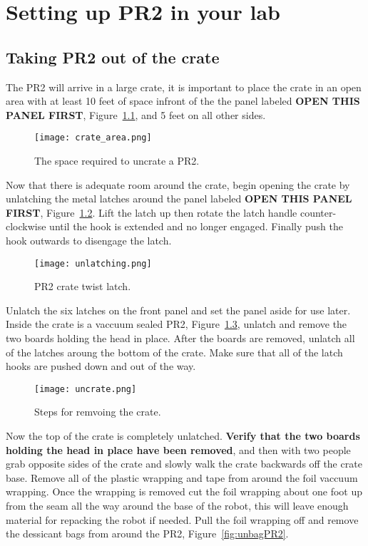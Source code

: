 \chapter{Setting up PR2 in your lab}
\section{Taking PR2 out of the crate}
The PR2 will arrive in a large crate, it is important to place the crate in an
open area with at least 10 feet of space infront of the the panel labeled {\bf
  OPEN THIS PANEL FIRST}, Figure~\ref{fig:crate_space}, and 5 feet on all other
sides.

\begin{figure}[h!]
\centering
\texttt{[image: crate\_area.png]}
\caption{The space required to uncrate a PR2.}
\label{fig:crate_space}
\end{figure}

Now that there is adequate room around the crate, begin opening the crate by
unlatching the metal latches around the panel labeled {\bf OPEN THIS PANEL
  FIRST}, Figure~\ref{fig:unlatch}. Lift the latch up then rotate the latch
handle counter-clockwise until the hook is extended and no longer
engaged. Finally push the hook outwards to disengage the latch.

\begin{figure}[h]
\centering
\texttt{[image: unlatching.png]}
\caption{PR2 crate twist latch.}
\label{fig:unlatch}
\end{figure}

Unlatch the six latches on the front panel and set the panel aside for use
later. Inside the crate is a vaccuum sealed PR2, Figure~\ref{fig:sealPR2},
unlatch and remove the two boards holding the head in place. After the boards
are removed, unlatch all of the latches aroung the bottom of the crate. Make
sure that all of the latch hooks are pushed down and out of the way.

\begin{figure}[h]
\centering
\texttt{[image: uncrate.png]}
\caption{Steps for remvoing the crate.}
\label{fig:sealPR2}
\end{figure}

Now the top of the crate is completely unlatched. {\bf Verify that the two boards holding the head in place have been removed}, and then with two people grab opposite
sides of the crate and slowly walk the crate backwards off the crate
base. Remove all of the plastic wrapping and tape from around the foil vaccuum
wrapping. Once the wrapping is removed cut the foil wrapping about one foot up
from the seam all the way around the base of the robot, this will leave enough
material for repacking the robot if needed. Pull the foil wrapping off and
remove the dessicant bags from around the PR2, Figure~\ref{fig:unbagPR2}.

